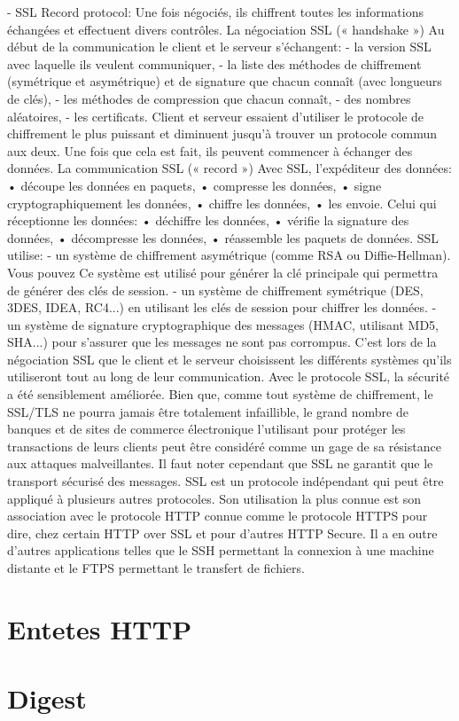 -	SSL Record protocol: Une fois négociés, ils chiffrent toutes les informations échangées et effectuent divers contrôles.
La négociation SSL (« handshake »)
Au début de la communication le client et le serveur s'échangent:
-	la version SSL avec laquelle ils veulent communiquer,
-	la liste des méthodes de chiffrement (symétrique et asymétrique) et de signature que chacun connaît (avec longueurs de clés),
-	les méthodes de compression que chacun connaît,
-	des nombres aléatoires,
-	les certificats.
Client et serveur essaient d'utiliser le protocole de chiffrement le plus puissant et diminuent jusqu'à trouver un protocole commun aux deux. Une fois que cela est fait, ils peuvent commencer à échanger des données. 
La communication SSL (« record »)
Avec SSL, l'expéditeur des données:
•	découpe les données en paquets,
•	compresse les données,
•	signe cryptographiquement les données,
•	chiffre les données,
•	les envoie.
Celui qui réceptionne les données:
•	déchiffre les données,
•	vérifie la signature des données,
•	décompresse les données,
•	réassemble les paquets de données.
SSL utilise:
-	un système de chiffrement asymétrique (comme RSA ou Diffie-Hellman). Vous pouvez Ce système est utilisé pour générer la clé principale qui permettra de générer des clés de session.
-	un système de chiffrement symétrique (DES, 3DES, IDEA, RC4...) en utilisant les clés de session pour chiffrer les données.
-	un système de signature cryptographique des messages (HMAC, utilisant MD5, SHA...) pour s'assurer que les messages ne sont pas corrompus.
C'est lors de la négociation SSL que le client et le serveur choisissent les différents systèmes qu’ils utiliseront tout au long de leur communication.
Avec le protocole SSL, la sécurité a été sensiblement améliorée. Bien que, comme tout système de chiffrement, le SSL/TLS ne pourra jamais être totalement infaillible, le grand nombre de banques et de sites de commerce électronique l'utilisant pour protéger les transactions de leurs clients peut être considéré comme un gage de sa résistance aux attaques malveillantes. Il faut noter cependant que SSL ne garantit que le transport sécurisé des messages.
SSL est un protocole indépendant qui peut être appliqué à plusieurs autres protocoles. Son utilisation la plus connue est son association avec le protocole HTTP connue comme le protocole HTTPS pour dire, chez certain HTTP over SSL et pour d’autres HTTP Secure. Il a en outre d’autres applications telles que le SSH permettant la connexion à une machine distante et le FTPS permettant le transfert de fichiers.

\section*{Entetes HTTP}

\section*{Digest}

